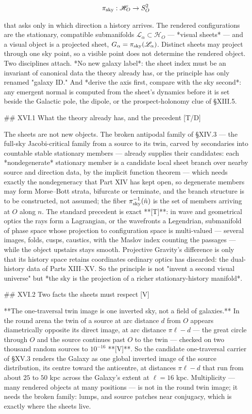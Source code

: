$$\pi_{\rm sky}:\mathscr H_O\to S^2_O$$

that asks only in which direction a history arrives. The rendered configurations are the stationary, compatible submanifolds $\mathscr L_\alpha\subset\mathscr H_O$ — *visual sheets* — and a visual object is a projected sheet, $G_\alpha = \pi_{\rm sky}(\mathscr L_\alpha)$. Distinct sheets may project through one sky point, so a visible point does not determine the rendered object. Two disciplines attach. *No new galaxy label*: the sheet index must be an invariant of canonical data the theory already has, or the principle has only renamed "galaxy ID." And *derive the axis first, compare with the sky second*: any emergent normal is computed from the sheet's dynamics before it is set beside the Galactic pole, the dipole, or the prospect-holonomy clue of §XIII.5.

## XVI.1 What the theory already has, and the precedent [T/D]

The sheets are not new objects. The broken antipodal family of §XIV.3 — the full-sky Jacobi-critical family from a source to its twin, carved by secondaries into countable stable stationary members — already supplies their candidates: each *nondegenerate* stationary member is a candidate local sheet branch over nearby source and direction data, by the implicit function theorem — which needs exactly the nondegeneracy that Part XIV has kept open, so degenerate members may form Morse–Bott strata, bifurcate or terminate, and the branch structure is to be constructed, not assumed; the fiber $\pi_{\rm sky}^{-1}(\hat n)$ is the set of members arriving at $O$ along $\hat n$. The standard precedent is exact **[T]**: in wave and geometrical optics the rays form a Lagrangian, or the wavefronts a Legendrian, submanifold of phase space whose projection to configuration space is multi-valued — several images, folds, cusps, caustics, with the Maslov index counting the passages — while the object upstairs stays smooth. Projective Gravity's difference is only that its history space retains coordinates ordinary optics has discarded: the dual-history data of Parts XIII–XV. So the principle is not "invent a second visual universe" but *the sky is the projection of a richer stationary-history manifold*.

## XVI.2 Two facts the sheets must respect [V]

**The one-traversal twin image is one inverted sky, not a field of galaxies.** In the round arena the twin of a source at arc distance $d$ from $O$ appears diametrically opposite its direct image, at arc distance $\pi\ell-d$ — the great circle through $O$ and the source continues past $O$ to the twin — checked on two thousand random sources to $10^{-16}$ **[V]**. So the candidate one-traversal carrier of §XV.3 renders the Galaxy as one global inverted image of the source distribution, its centre toward the anticentre, at distances $\pi\ell-d$ that run from about $25$ to $50$ kpc across the Galaxy's extent at $\ell = 16$ kpc. Multiplicity — many rendered objects at many positions — is not in the round twin image; it needs the broken family: lumps, and source patches near conjugacy, which is exactly where the sheets live.


